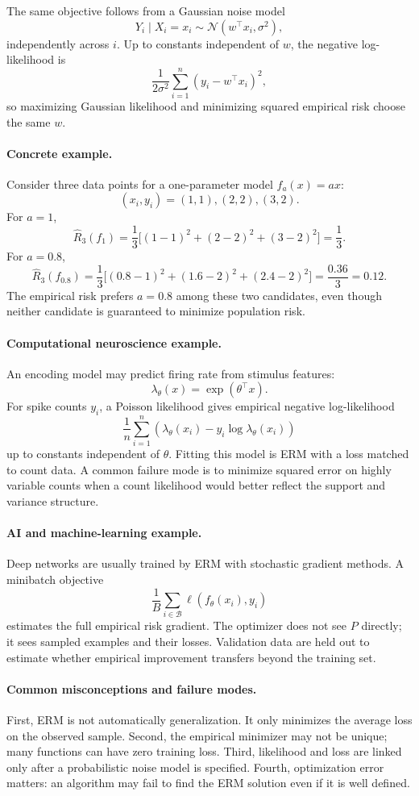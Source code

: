 The same objective follows from a Gaussian noise model
\[
Y_i\mid X_i=x_i\sim\mathcal N(w^\top x_i,\sigma^2),
\]
independently across \(i\). Up to constants independent of \(w\), the negative log-likelihood is
\[
\frac{1}{2\sigma^2}\sum_{i=1}^n (y_i-w^\top x_i)^2,
\]
so maximizing Gaussian likelihood and minimizing squared empirical risk choose the same \(w\).

\paragraph{Concrete example.}
Consider three data points for a one-parameter model \(f_a(x)=a x\):
\[
(x_i,y_i)=(1,1),(2,2),(3,2).
\]
For \(a=1\),
\[
\widehat R_3(f_1)=\frac{1}{3}\bigl[(1-1)^2+(2-2)^2+(3-2)^2\bigr]=\frac{1}{3}.
\]
For \(a=0.8\),
\[
\widehat R_3(f_{0.8})
=\frac{1}{3}\bigl[(0.8-1)^2+(1.6-2)^2+(2.4-2)^2\bigr]
=\frac{0.36}{3}=0.12.
\]
The empirical risk prefers \(a=0.8\) among these two candidates, even though neither candidate is guaranteed to minimize population risk.

\paragraph{Computational neuroscience example.}
An encoding model may predict firing rate from stimulus features:
\[
\lambda_\theta(x)=\exp(\theta^\top x).
\]
For spike counts \(y_i\), a Poisson likelihood gives empirical negative log-likelihood
\[
\frac{1}{n}\sum_{i=1}^n
\left(\lambda_\theta(x_i)-y_i\log \lambda_\theta(x_i)\right)
\]
up to constants independent of \(\theta\). Fitting this model is ERM with a loss matched to count data. A common failure mode is to minimize squared error on highly variable counts when a count likelihood would better reflect the support and variance structure.

\paragraph{AI and machine-learning example.}
Deep networks are usually trained by ERM with stochastic gradient methods. A minibatch objective
\[
\frac{1}{B}\sum_{i\in\mathcal B}\ell(f_\theta(x_i),y_i)
\]
estimates the full empirical risk gradient. The optimizer does not see \(P\) directly; it sees sampled examples and their losses. Validation data are held out to estimate whether empirical improvement transfers beyond the training set.

\paragraph{Common misconceptions and failure modes.}
First, ERM is not automatically generalization. It only minimizes the average loss on the observed sample. Second, the empirical minimizer may not be unique; many functions can have zero training loss. Third, likelihood and loss are linked only after a probabilistic noise model is specified. Fourth, optimization error matters: an algorithm may fail to find the ERM solution even if it is well defined.

